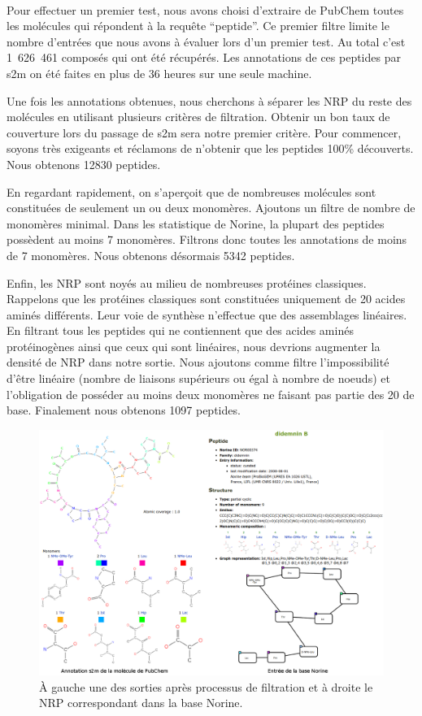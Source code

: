 \documentclass[12pt,french,twoside]{report}
\begin{document}
\paragraph{}Pour effectuer un premier test, nous avons choisi d'extraire de PubChem toutes les molécules qui répondent à la requête ``peptide''.
Ce premier filtre limite le nombre d'entrées que nous avons à évaluer lors d'un premier test.
Au total c'est 1~626~461 composés qui ont été récupérés.
Les annotations de ces peptides par s2m on été faites en plus de 36 heures sur une seule machine.

Une fois les annotations obtenues, nous cherchons à séparer les NRP du reste des molécules en utilisant plusieurs critères de filtration.
Obtenir un bon taux de couverture lors du passage de s2m sera notre premier critère.
Pour commencer, soyons très exigeants et réclamons de n'obtenir que les peptides 100\% découverts.
Nous obtenons 12830 peptides.

En regardant rapidement, on s'aperçoit que de nombreuses molécules sont constituées de seulement un ou deux monomères.
Ajoutons un filtre de nombre de monomères minimal.
Dans les statistique de Norine, la plupart des peptides possèdent au moins 7 monomères.
Filtrons donc toutes les annotations de moins de 7 monomères.
Nous obtenons désormais 5342 peptides.

Enfin, les NRP sont noyés au milieu de nombreuses protéines classiques.
Rappelons que les protéines classiques sont constituées uniquement de 20 acides aminés différents.
Leur voie de synthèse n'effectue que des assemblages linéaires.
En filtrant tous les peptides qui ne contiennent que des acides aminés protéinogènes ainsi que ceux qui sont linéaires, nous devrions augmenter la densité de NRP dans notre sortie.
Nous ajoutons comme filtre l'impossibilité d'être linéaire (nombre de liaisons supérieurs ou égal à nombre de noeuds) et l'obligation de posséder au moins deux monomères ne faisant pas partie des 20 de base.
Finalement nous obtenons 1097 peptides.

\begin{figure}[h!]
  \begin{center}
    \includegraphics[width=450px]{Figures/contributions/didemnin_B.png}
    \caption{\label{didemin}À gauche une des sorties après processus de filtration et à droite le NRP correspondant dans la base Norine.}
  \end{center}
\end{figure}
\end{document}
